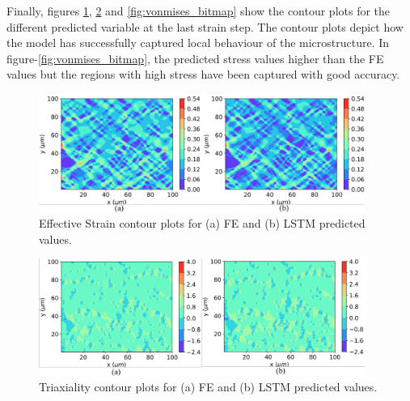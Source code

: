 Finally, figures \ref{fig:eff_strain_bitmap}, \ref{fig:tri_bitmap} and \ref{fig:vonmises_bitmap} show the contour plots for the different predicted variable at the last strain step. The contour plots depict how the model has successfully captured local behaviour of the microstructure. In figure-\ref{fig:vonmises_bitmap}, the predicted stress values higher than the FE values but the regions with high stress have been captured with good accuracy.

\begin{figure}[!h]
	\centering
	\includegraphics[width=0.95\textwidth]{Pictures/lstm-res/eff_strain_bitmap.png}
	\hspace{1mm}
	\caption{Effective Strain contour plots for (a) FE and (b) LSTM predicted values.} 
	\label{fig:eff_strain_bitmap}
\end{figure}

\begin{figure}[!h]
	\centering
	\includegraphics[width=0.95\textwidth]{Pictures/lstm-res/tri_bitmap.png}
	\hspace{1mm}
	\caption{Triaxiality contour plots for (a) FE and (b) LSTM predicted values.} 
	\label{fig:tri_bitmap}
\end{figure}

